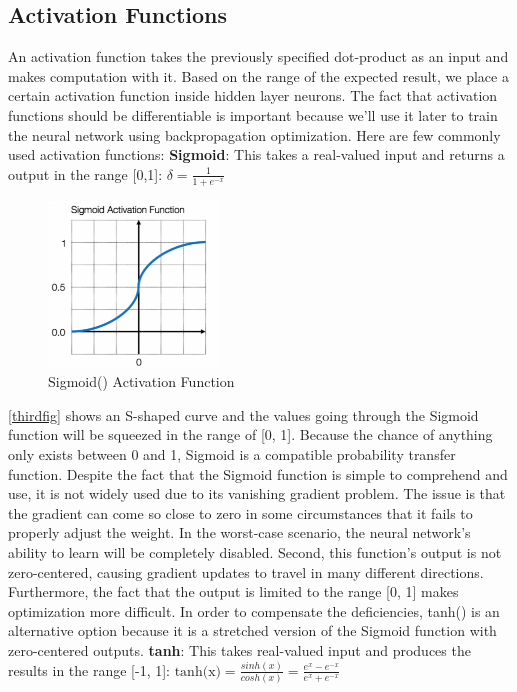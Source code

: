\documentclass[a4paper,11pt,oneside]{book}
\begin{document}
\subsection{Activation Functions}
An activation function takes the previously specified dot-product as an input and makes computation with it. Based on the range of the expected result, we place a certain activation function inside hidden layer neurons. The fact that activation functions should be differentiable is important because we'll use it later to train the neural network using backpropagation optimization.
\newline\newline
Here are few commonly used activation functions:\newline\newline
\textbf{Sigmoid}: This takes a real-valued input and returns a output in the range [0,1]:\newline\newline
$\delta = \frac{1}{1+e^{-x}}$
\begin{figure}[!h]
	\centering
	\includegraphics[width=0.4\textwidth]{figures/neuro}
	\caption{Sigmoid() Activation Function}
	\label{thirdfig}
\end{figure}

\autoref{thirdfig} shows an S-shaped curve and the values going
through the Sigmoid function will be squeezed in the range of [0, 1].
Because the chance of anything only exists between 0 and 1, Sigmoid is a compatible probability transfer function.
Despite the fact that the Sigmoid function is simple to comprehend and use, it is not widely used due to its vanishing gradient problem. The issue is that the gradient can come so close to zero in some circumstances that it fails to properly adjust the weight. In the worst-case scenario, the neural network's ability to learn will be completely disabled. Second, this function's output is not zero-centered, causing gradient updates to travel in many different directions. Furthermore, the fact that the output is limited to the range [0, 1] makes optimization more difficult.
In order to compensate the deficiencies, tanh() is an alternative option
because it is a stretched version of the Sigmoid function with zero-centered outputs. \newline\newline
\textbf{tanh}: This takes real-valued input and produces the results in the range [-1, 1]:\newline\newline
$\text{tanh(x)}=\frac{sinh(x)}{cosh(x)}=\frac{e^{x}-e^{-x}}{e^{x}+e^{-x}}$
\end{document}
